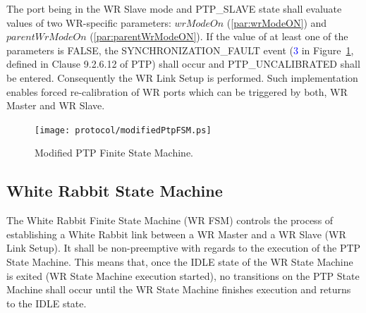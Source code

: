 \documentclass[a4paper, 12pt]{article}
\begin{document}
The port being in the WR Slave mode and PTP\_SLAVE state shall evaluate values of two WR-specific 
parameters: $wrModeOn$ (\ref{par:wrModeON}) and $parentWrModeOn$ (\ref{par:parentWrModeON}). 
If the value of at least one of the parameters is FALSE, the SYNCHRONIZATION\_FAULT event 
(\textcolor{blue}{3} in Figure~\ref{fig:modifiedPtpFSM}, defined in Clause 9.2.6.12 of PTP) shall 
occur and PTP\_UNCALIBRATED shall be entered. Consequently the WR Link Setup is performed. 
Such implementation enables forced re-calibration of WR ports which can be triggered by both, 
WR Master and WR Slave.

 

% 

\newpage

\begin{figure}[ht!]
  \centering
  \texttt{[image: protocol/modifiedPtpFSM.ps]}
  \caption{Modified PTP Finite State Machine.}
  \label{fig:modifiedPtpFSM}
\end{figure}



\newpage

\subsection{White Rabbit State Machine}
\label{wrFSM}

The White Rabbit Finite State Machine (WR FSM) controls the process of establishing a White Rabbit 
link between a WR Master and a WR Slave (WR Link Setup). It shall be non-preemptive with regards 
to the execution of the PTP State Machine. This means that, once the IDLE state of the WR State Machine is 
exited (WR State Machine execution started), no transitions on the PTP State Machine shall occur 
until the WR State Machine finishes execution and returns to the IDLE state. 
\end{document}
